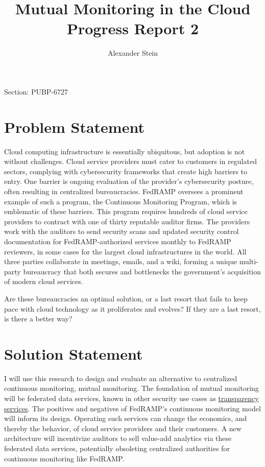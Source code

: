 \documentclass{jdf}
\begin{document}
Section: PUBP-6727
\title{Mutual Monitoring in the Cloud \\ Progress Report 2}
\author{Alexander Stein}

\maketitle
\thispagestyle{fancy}


\section*{Problem Statement}

Cloud computing infrastructure is essentially ubiquitous, but adoption is not without challenges. Cloud service providers must cater to customers in regulated sectors, complying with cybersecurity frameworks that create high barriers to entry. One barrier is ongoing evaluation of the provider's cybersecurity posture, often resulting in centralized bureaucracies. FedRAMP oversees a prominent example of such a program, the Continuous Monitoring Program, which is emblematic of these barriers. This program requires hundreds of cloud service providers to contract with one of thirty reputable auditor firms. The providers work with the auditors to send security scans and updated security control documentation for FedRAMP-authorized services monthly to FedRAMP reviewers, in some cases for the largest cloud infrastructures in the world. All three parties collaborate in meetings, emails, and a wiki, forming a unique multi-party bureaucracy that both secures and bottlenecks the government's acquisition of modern cloud services.

Are these bureaucracies an optimal solution, or a last resort that fails to keep pace with cloud technology as it proliferates and evolves? If they are a last resort, is there a better way?

\section*{Solution Statement}

I will use this research to design and evaluate an alternative to centralized continuous monitoring, mutual monitoring. The foundation of mutual monitoring will be federated data services, known in other security use cases as \hyperlink{https://transparency.dev}{transparency services}. The positives and negatives of FedRAMP's continuous monitoring model will inform its design. Operating such services can change the economics, and thereby the behavior, of cloud service providers and their customers. A new architecture will incentivize auditors to sell value-add analytics via these federated data services, potentially obsoleting centralized authorities for continuous monitoring like FedRAMP.
\end{document}
